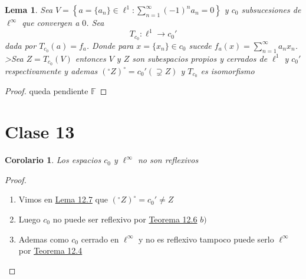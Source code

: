 \documentclass[10pt]{extarticle}
\theoremstyle{break}
\newtheorem{corollary}{Corolario}[theorem]
\newtheorem{lemma}[theorem]{Lema}
\theoremstyle{definition}
\begin{document}
\begin{lemma}\label{12.7}
Sea $V=\left\{  a=\{ a_{n} \}\in \ell^{1} : \sum^{\infty}_{n=1}(-1)^{n}a_{n}=0 \right\}$ y $c_{0}$ subsucesiones de $\ell^{\infty}$ que convergen a $0$. Sea $$T_{c_{0}}:\ell^{1}\rightarrow c_{0}'$$ dada por $T_{c_{0}}(a)=f_{a}$. Donde para $x=\{ x_{n} \}\in c_{0}$ sucede $f_{a}(x)=\sum^{\infty}_{n=1}a_{n}x_{n}$.
>Sea $Z=T_{c_{0}}(V)$ entonces $V$ y $Z$ son subespacios propios y cerrados de $\ell^{1}$ y $c_{0}'$ respectivamente y ademas $(^{\circ}Z)^{\circ}=c_{0}'(\supsetneq Z)$ y $T_{c_{0}}$ es isomorfismo
\end{lemma}
\begin{proof}
queda pendiente $\mathbb{F}$
\end{proof}

\section{Clase 13}
\begin{corollary}
	Los espacios $c_{0}$ y $\ell^{\infty}$ no son reflexivos
\end{corollary}
\begin{proof}
	\begin{enumerate}
		\item Vimos en \hyperref[12.7]{Lema 12.7}  que $ ( ^{\circ}Z  ) ^{\circ} =c_{0}'\neq Z $ 
		\item Luego $ c_{0} $ no puede ser reflexivo por \hyperref[12.6]{Teorema 12.6} $ b) $ 
		\item Ademas como $ c_{0} $ cerrado en $ \ell^{\infty}  $ y no es reflexivo tampoco puede serlo $ \ell^{\infty}  $ por \hyperref[12.4]{Teorema 12.4} 
	\end{enumerate}
\end{proof}
\end{document}
